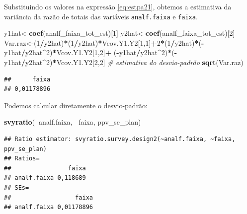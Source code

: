 \documentclass[]{book}
\newenvironment{Shaded}{\begin{snugshade}}{\end{snugshade}}
\newcommand{\KeywordTok}[1]{\textcolor[rgb]{0.13,0.29,0.53}{\textbf{#1}}}
\newcommand{\DecValTok}[1]{\textcolor[rgb]{0.00,0.00,0.81}{#1}}
\newcommand{\CommentTok}[1]{\textcolor[rgb]{0.56,0.35,0.01}{\textit{#1}}}
\newcommand{\OperatorTok}[1]{\textcolor[rgb]{0.81,0.36,0.00}{\textbf{#1}}}
\newcommand{\NormalTok}[1]{#1}
\theoremstyle{definition}
\theoremstyle{definition}
\theoremstyle{definition}
\theoremstyle{remark}
\begin{document}
Substituindo os valores na expressão \eqref{eq:estpa21}, obtemos a
estimativa da variância da razão de totais das variáveis
\texttt{analf.faixa} e \texttt{faixa}.

\begin{Shaded}
\begin{Highlighting}[]
\NormalTok{y1hat<-}\KeywordTok{coef}\NormalTok{(analf_faixa_tot_est)[}\DecValTok{1}\NormalTok{]}
\NormalTok{y2hat<-}\KeywordTok{coef}\NormalTok{(analf_faixa_tot_est)[}\DecValTok{2}\NormalTok{]}
\NormalTok{Var.raz<-(}\DecValTok{1}\OperatorTok{/}\NormalTok{y2hat)}\OperatorTok{*}\NormalTok{(}\DecValTok{1}\OperatorTok{/}\NormalTok{y2hat)}\OperatorTok{*}\NormalTok{Vcov.Y1.Y2[}\DecValTok{1}\NormalTok{,}\DecValTok{1}\NormalTok{]}\OperatorTok{+}\DecValTok{2}\OperatorTok{*}\NormalTok{(}\DecValTok{1}\OperatorTok{/}\NormalTok{y2hat)}\OperatorTok{*}\NormalTok{(}\OperatorTok{-}\NormalTok{y1hat}\OperatorTok{/}\NormalTok{y2hat}\OperatorTok{^}\DecValTok{2}\NormalTok{)}\OperatorTok{*}\NormalTok{Vcov.Y1.Y2[}\DecValTok{1}\NormalTok{,}\DecValTok{2}\NormalTok{]}\OperatorTok{+}
\NormalTok{(}\OperatorTok{-}\NormalTok{y1hat}\OperatorTok{/}\NormalTok{y2hat}\OperatorTok{^}\DecValTok{2}\NormalTok{)}\OperatorTok{*}\NormalTok{(}\OperatorTok{-}\NormalTok{y1hat}\OperatorTok{/}\NormalTok{y2hat}\OperatorTok{^}\DecValTok{2}\NormalTok{)}\OperatorTok{*}\NormalTok{Vcov.Y1.Y2[}\DecValTok{2}\NormalTok{,}\DecValTok{2}\NormalTok{]}
\CommentTok{# estimativa do desvio-padrão}
\KeywordTok{sqrt}\NormalTok{(Var.raz)}
\end{Highlighting}
\end{Shaded}

\begin{verbatim}
##      faixa 
## 0,01178896
\end{verbatim}

Podemos calcular diretamente o desvio-padrão:

\begin{Shaded}
\begin{Highlighting}[]
\KeywordTok{svyratio}\NormalTok{(}\OperatorTok{~}\NormalTok{analf.faixa, }\OperatorTok{~}\NormalTok{faixa, ppv_se_plan)}
\end{Highlighting}
\end{Shaded}

\begin{verbatim}
## Ratio estimator: svyratio.survey.design2(~analf.faixa, ~faixa, ppv_se_plan)
## Ratios=
##                faixa
## analf.faixa 0,118689
## SEs=
##                  faixa
## analf.faixa 0,01178896
\end{verbatim}
\end{document}
